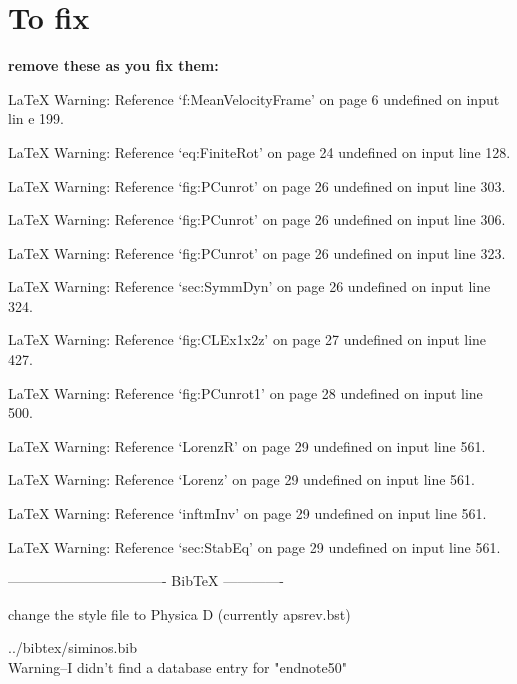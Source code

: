 
\section*{To fix}

{\bf remove these as you fix them:}





LaTeX Warning: Reference `f:MeanVelocityFrame' on page 6 undefined on input lin
e 199.




LaTeX Warning: Reference `eq:FiniteRot' on page 24 undefined on input line 128.


LaTeX Warning: Reference `fig:PCunrot' on page 26 undefined on input line 303.


LaTeX Warning: Reference `fig:PCunrot' on page 26 undefined on input line 306.


LaTeX Warning: Reference `fig:PCunrot' on page 26 undefined on input line 323.


LaTeX Warning: Reference `sec:SymmDyn' on page 26 undefined on input line 324.


LaTeX Warning: Reference `fig:CLEx1x2z' on page 27 undefined on input line 427.


LaTeX Warning: Reference `fig:PCunrot1' on page 28 undefined on input line 500.


LaTeX Warning: Reference `LorenzR' on page 29 undefined on input line 561.


LaTeX Warning: Reference `Lorenz' on page 29 undefined on input line 561.


LaTeX Warning: Reference `inftmInv' on page 29 undefined on input line 561.


LaTeX Warning: Reference `sec:StabEq' on page 29 undefined on input line 561.

---------------------------------- BibTeX -------------


change the style file to Physica D (currently apsrev.bst)

../bibtex/siminos.bib
\\
Warning--I didn't find a database entry for "endnote50"
